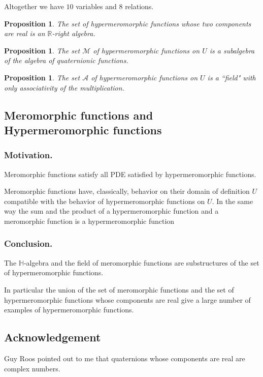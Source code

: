 \documentclass[12pt]{amsart}
\newtheorem{prop}[thm]{Proposition}
\theoremstyle{definition}
\begin{document}
Altogether we have $10$ variables and $8$ relations.

\begin{prop}The set of hypermeromorphic functions whose two components are real is an ${\mathbb R}$-right algebra.
\end{prop} 

\begin{prop} {The set ${\mathcal M}$ of hypermeromorphic functions on $U$ is a subalgebra of the algebra of quaternionic functions.}
\end{prop}

\begin{prop} The set ${\mathcal A}$ of hypermeromorphic functions on $U$ is a ``field" with only associativity of the multiplication. \end{prop}

\subsection{Meromorphic functions and Hypermeromorphic functions} 

\subsubsection{Motivation.}

Meromorphic functions satisfy all PDE satisfied by hypermeromorphic functions. 

Meromorphic functions have, classically, behavior on their domain of definition $U$ compatible with the behavior of hypermeromorphic functions on $U$. In the same way the sum and the product of a hypermeromorphic function and a meromorphic function is a hypermeromorphic function 

\subsubsection{Conclusion.} The ${\mathbb H}$-algebra and the field of meromorphic functions are substructures of the set of hypermeromorphic functions. 

In particular the union of the set of meromorphic functions and the set of hypermeromorphic functions whose components are real give a large number of examples of hypermeromorphic functions.

\subsection{Acknowledgement}Guy Roos pointed out to me that quaternions whose components are real are complex numbers. 
\end{document}
